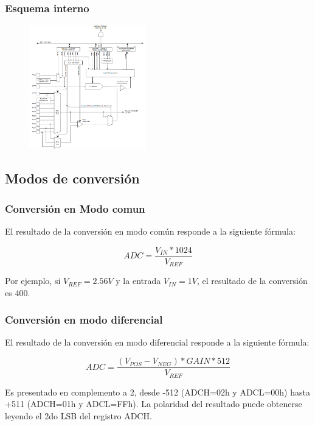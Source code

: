 \documentclass{beamer}
\begin{document}
\begin{frame}
\frametitle{Esquema interno}
\begin{figure}[!h]
\centering
\includegraphics[width=2in]{adc}
\end{figure}
\end{frame}

\subsection{Modos de conversión}
\begin{frame}
\frametitle{Conversión en Modo comun}
El resultado de la conversión en modo común responde a la siguiente fórmula:

$$ADC  =\frac{V_{IN}*1024}{V_{REF}}$$

Por ejemplo, si $V_{REF}=2.56V$ y la entrada $V_{IN}=1V$, el resultado de la conversión es 400.
\end{frame}

\begin{frame}
\frametitle{Conversión en modo diferencial}
El resultado de la conversión en modo diferencial responde a la siguiente fórmula:

$$ADC  =\frac{(V_{POS}-V_{NEG})*GAIN*512}{V_{REF}}$$

Es presentado en complemento a 2, desde -512 (ADCH=02h y ADCL=00h) hasta +511 (ADCH=01h y ADCL=FFh).
La polaridad del resultado puede obtenerse leyendo el 2do LSB del registro ADCH.
\end{frame}

\begin{frame}
\frametitle{}

\end{frame}

\begin{frame}
\frametitle{}

\end{frame}
\end{document}
